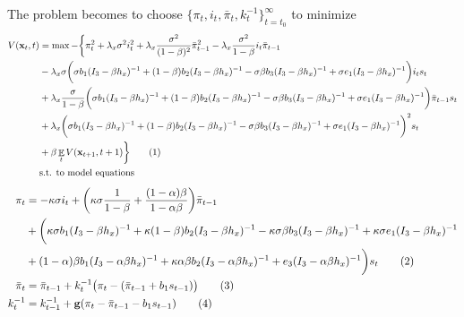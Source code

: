 \documentclass[11pt]{article}
\renewcommand{\[}{\begin{equation}}
\renewcommand{\]}{\end{equation}}
\DeclareMathOperator{\E}{\mathbb{E}}
\newcommand\numberthis{\addtocounter{equation}{1}\tag{\theequation}} %
\begin{document}
The problem becomes to choose $\{\pi_t, i_t, \bar{\pi}_t, k_t^{-1}\}_{t=t_0}^{\infty}$ to minimize
\begin{align*}
V(\mathbf{x}_t,t)& = \max -\bigg\{ \pi_t^2 +  \lambda_x\sigma^2 i_t^2 +\lambda_x\frac{\sigma^2}{(1-\beta)^2}\bar{\pi}_{t-1}^2 -\lambda_x\frac{\sigma^2}{1-\beta}i_t \bar{\pi}_{t-1} \\
&-\lambda_x\sigma\bigg(\sigma b_1(I_3 - \beta h_x)^{-1}  +  (1-\beta)b_2 (I_3 - \beta h_x)^{-1} - \sigma\beta b_3 (I_3 - \beta h_x)^{-1} +\sigma e_1(I_3 - \beta h_x)^{-1}\bigg)i_ts_t\\
& + \lambda_x \frac{\sigma}{1-\beta}\bigg(\sigma b_1(I_3 - \beta h_x)^{-1}  +  (1-\beta)b_2 (I_3 - \beta h_x)^{-1} - \sigma\beta b_3 (I_3 - \beta h_x)^{-1} +\sigma e_1(I_3 - \beta h_x)^{-1}\bigg)\bar{\pi}_{t-1}s_t\\
& +\lambda_x\bigg(\sigma b_1(I_3 - \beta h_x)^{-1}  +  (1-\beta)b_2 (I_3 - \beta h_x)^{-1} - \sigma\beta b_3 (I_3 - \beta h_x)^{-1} +\sigma e_1(I_3 - \beta h_x)^{-1}\bigg)^2s_t \\
& + \beta \E_t V(\mathbf{x}_{t+1},t+1) \bigg\} \numberthis \\
& \text{s.t. to model equations}
\end{align*}
 \begin{align*}
 \pi_t & = -\kappa\sigma i_t +\bigg(\kappa\sigma \frac{1}{1-\beta} +  \frac{(1-\alpha)\beta}{1-\alpha\beta}\bigg)\bar{\pi}_{t-1}  \\
 & +\bigg(\kappa\sigma b_1(I_3 - \beta h_x)^{-1}   +  \kappa(1-\beta)b_2 (I_3 - \beta h_x)^{-1} - \kappa\sigma\beta b_3 (I_3 - \beta h_x)^{-1}+\kappa\sigma e_1(I_3 - \beta h_x)^{-1}   \\
 &  + (1-\alpha)\beta b_1(I_3 - \alpha\beta h_x)^{-1}  +\kappa\alpha\beta b_2 (I_3 - \alpha\beta h_x)^{-1} +e_3(I_3 - \alpha\beta h_x)^{-1}\bigg)s_t \numberthis \\
 \bar{\pi}_{t} & = \bar{\pi}_{t-1} + k_t^{-1}\big(\pi_{t} -(\bar{\pi}_{t-1}+b_1 s_{t-1}) \big)   \numberthis  \\
 k_t^{-1} & = k_{t-1}^{-1}+ \mathbf{g}(\pi_t - \bar{\pi}_{t-1}-b_1 s_{t-1})  \numberthis
\end{align*}
\end{document}
